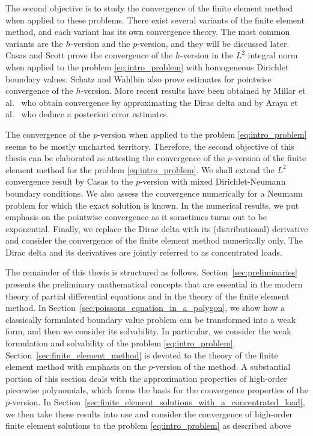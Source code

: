 \documentclass[english, 12pt, a4paper, sci, utf8, a-2b, online]{aaltothesis}
\theoremstyle{definition}
\theoremstyle{plain}
\numberwithin{equation}{section}
\begin{document}
The second objective is to study the convergence
of the finite element method when applied to these problems.
There exist several variants of the finite element method, and each
variant has its own convergence theory. The most common variants
are the $h$-version and the $p$-version, and they will be discussed later.
Casas \cite{casas1985} and Scott \cite{scott1973}
prove the convergence of the $h$-version in the $L^2$ integral norm
when applied to the problem \eqref{eq:intro_problem} with homogeneous Dirichlet
boundary values.
Schatz and Wahlbin \cite{schatzwahlbin1977} also prove estimates for pointwise
convergence of the $h$-version.
More recent results have been obtained by Millar et al.\ \cite{millarmuga2021}
who obtain convergence by approximating the
Dirac delta and by Araya et al.\ \cite{arayabehrens2006} who deduce
a posteriori error estimates.

The convergence of the $p$-version when applied to the problem 
\eqref{eq:intro_problem} seems to be mostly uncharted territory.
Therefore, the second objective of this thesis can be elaborated as
attesting the convergence of the $p$-version of the finite element method
for the problem \eqref{eq:intro_problem}. We shall extend
the $L^2$ convergence result by Casas to the $p$-version
with mixed Dirichlet-Neumann boundary conditions.
We also assess the convergence numerically for a Neumann problem for which
the exact solution is known. In the numerical results, we put emphasis on
the pointwise convergence as it sometimes turns out to be exponential.
Finally, we replace the Dirac delta with its (distributional)
derivative and consider the convergence of the finite element method
numerically only.
The Dirac delta and its derivatives are jointly referred to as 
concentrated loads.

The remainder of this thesis is structured as follows.
Section~\ref{sec:preliminaries} presents the preliminary mathematical
concepts that are essential in the modern theory of partial differential equations
and in the theory of the finite element method.
In Section~\ref{sec:poissons_equation_in_a_polygon},
we show how a classically formulated boundary value problem can be
transformed into a weak form, and then we consider its solvability.
In particular, we consider the weak formulation and solvability of
the problem \eqref{eq:intro_problem}.
Section~\ref{sec:finite_element_method} is devoted to the theory
of the finite element method with emphasis on the $p$-version of the method.
A substantial portion of this section deals with the approximation properties
of high-order piecewise polynomials, which forms the basis for the
convergence properties of the $p$-version.
In Section~\ref{sec:finite_element_solutions_with_a_concentrated_load},
we then take these results into use and consider the convergence of
high-order finite element solutions to the problem \eqref{eq:intro_problem}
as described above
\end{document}
